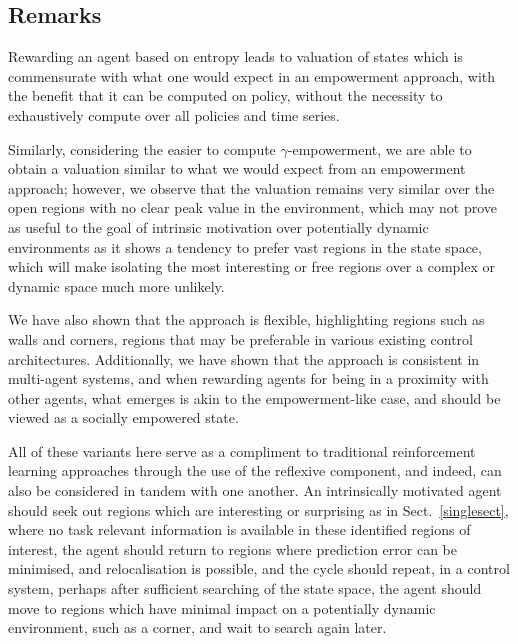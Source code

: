 \documentclass{article}
\begin{document}
\subsection{Remarks}
Rewarding an agent based on entropy leads to valuation of states which is commensurate with what one would expect in an empowerment approach, with the benefit that it can be computed on policy, without the necessity to exhaustively compute over all policies and time series.

Similarly, considering the easier to compute $\gamma$-empowerment, we are able to obtain a valuation similar to what we would expect from an empowerment approach; however, we observe that the valuation remains very similar over the open regions with no clear peak value in the environment, which may not prove as useful to the goal of intrinsic motivation over potentially dynamic environments as it shows a tendency to prefer vast regions in the state space, which will make isolating the most interesting or free regions over a complex or dynamic space much more unlikely.

We have also shown that the approach is flexible, highlighting regions such as walls and corners, regions that may be preferable in various existing control architectures. Additionally, we have shown that the approach is consistent in multi-agent systems, and when rewarding agents for being in a proximity with other agents, what emerges is akin to the empowerment-like case, and should be viewed as a socially empowered state.


All of these variants here serve as a compliment to traditional reinforcement learning approaches through the use of the reflexive component, and indeed, can also be considered in tandem with one another. An intrinsically motivated agent should seek out regions which are interesting or surprising as in Sect.~\ref{singlesect}, where no task relevant information is available in these identified regions of interest, the agent should return to regions where prediction error can be minimised, and relocalisation is possible, and the cycle should repeat, in a control system, perhaps after sufficient searching of the state space, the agent should move to regions which have minimal impact on a potentially dynamic environment, such as a corner, and wait to search again later.
\end{document}
